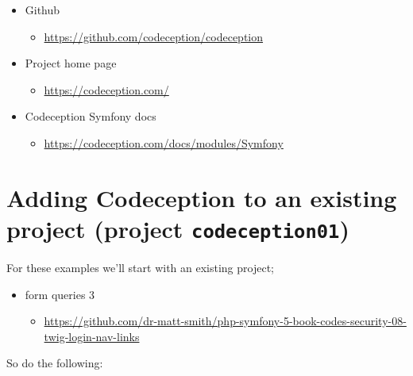 \documentclass[a4paperpaper,openright]{book}
\providecommand{\tightlist}{%
  \setlength{\itemsep}{0pt}\setlength{\parskip}{0pt}}
\begin{document}
\begin{itemize}
\item
  Github

  \begin{itemize}
  \tightlist
  \item
    \url{https://github.com/codeception/codeception}
  \end{itemize}
\item
  Project home page

  \begin{itemize}
  \tightlist
  \item
    \url{https://codeception.com/}
  \end{itemize}
\item
  Codeception Symfony docs

  \begin{itemize}
  \tightlist
  \item
    \url{https://codeception.com/docs/modules/Symfony}
  \end{itemize}
\end{itemize}

\hypertarget{adding-codeception-to-an-existing-project-project-codeception01}{%
\section{\texorpdfstring{Adding Codeception to an existing project
(project
\texttt{codeception01})}{Adding Codeception to an existing project (project codeception01)}}\label{adding-codeception-to-an-existing-project-project-codeception01}}

For these examples we'll start with an existing project;

\begin{itemize}
\item
  form queries 3

  \begin{itemize}
  \tightlist
  \item
    \url{https://github.com/dr-matt-smith/php-symfony-5-book-codes-security-08-twig-login-nav-links}
  \end{itemize}
\end{itemize}

So do the following:
\end{document}

